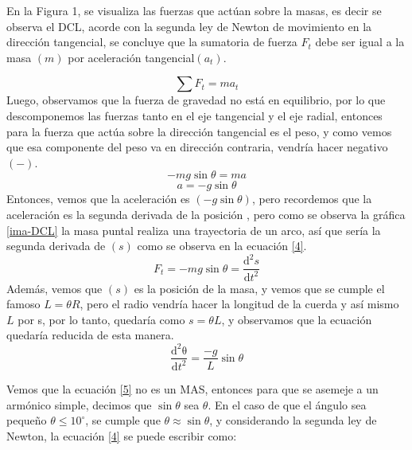 \documentclass[10pt,a4paper]{article}
\begin{document}
\begin{multicols}{2}
En la Figura 1, se visualiza las fuerzas que actúan sobre la masas, es decir se observa el DCL, \cite{tecalco2021aproximacion} acorde con la segunda ley de Newton de movimiento en la dirección tangencial, se concluye que la sumatoria de fuerza $F_{t}$ debe ser igual a la masa $(m)$ por aceleración tangencial$(a_{t})$.

\begin{equation}
	\sum F_{t}= m a_{t}
	\label{1}
\end{equation}
Luego, observamos que la fuerza de gravedad no está en equilibrio, por lo que descomponemos las fuerzas tanto en el eje tangencial y el eje radial, entonces para la fuerza que actúa sobre la dirección tangencial es el peso, y como vemos que esa componente del peso va en dirección contraria, vendría hacer negativo $(-)$.
\begin{equation}
	-mg \sin \theta = ma
	\label{2}
\end{equation}
\begin{equation}
	a = -g \sin \theta
	\label{3}
\end{equation}
Entonces, vemos que la aceleración es $(-g \sin \theta)$, pero recordemos que la aceleración es la segunda derivada de la posición  \cite{rendon2021sistema}, pero como se observa la gráfica \ref{ima-DCL} la masa puntal realiza una trayectoria de un arco, así que sería la segunda derivada de $(s)$ como se observa en la ecuación \ref{4}.
\begin{equation}
	F_{t}= -mg \sin \theta = \frac{\mathrm{d}^2s }{\mathrm{d} t^2}
	\label{4}
\end{equation}
Además, vemos que $(s)$ es la posición de la masa, y vemos que se cumple el famoso $L= \theta R$, pero el radio vendría hacer la longitud de la cuerda y así mismo $L$ por s, por lo tanto, quedaría como $s = \theta L $, y observamos que la ecuación quedaría reducida de esta manera.
\begin{equation}
	\frac{\mathrm{d^{2}\theta} }{\mathrm{d} t^{2}}=\frac{-g}{L}\sin \theta
	\label{5}
\end{equation}

Vemos que la ecuación \ref{5} no es un MAS, entonces para que se asemeje a un armónico simple, decimos que $\sin \theta$ sea $\theta$. En el caso de que el ángulo sea pequeño $ \theta \leq 10^{\circ{}}$, se cumple que $ \theta \approx \sin \theta $, y considerando la segunda ley de Newton, la ecuación \ref{4} se puede escribir como:



\end{multicols}
\end{document}

